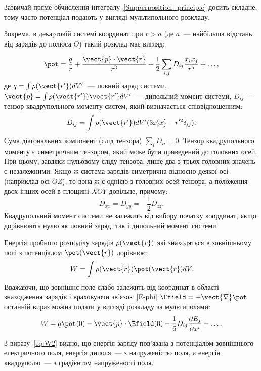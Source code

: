 \begin{Theory}
	Зазвичай пряме обчислення інтегралу~\eqref{Supperposition_principle} досить складне, тому часто потенціал подають у вигляді мультипольного розкладу.

	Зокрема, в декартовій системі координат при $r > a$ (де $a$~--- найбільша відстань від зарядів до полюса $O$) такий розклад має вигляд:

	\begin{equation}\label{eq:multipole2}
		\pot = \frac{q}{r} + \frac{\vect{p}\cdot\vect{r}}{r^3} + \frac12\sum\limits_{i,j} D_{ij}\frac{x_ix_j}{r^5} + \ldots,
	\end{equation}
	де $q = \int \rho(\vect{r'}) dV'$~--- повний заряд системи, $\vect{p} =\int \rho(\vect{r'}) \vect{r'} dV'$~--- дипольний момент системи, $D_{ij}$~--- тензор квадрупольного моменту систем, який визначається співвідношенням:
	\begin{equation}\label{eq:Quadrupole_momentum}
		D_{ij} = \int \rho(\vect{r'}) dV' (3x'_ix'_j - r^{\prime 2}\delta_{ij}).
	\end{equation}
	Сума діагональних компонент (слід тензора) $\sum\limits_{i} D_{ii} = 0$. Тензор квадрупольного моменту є симетричним тензором, який може бути приведений до головних осей. При цьому, завдяки нульовому сліду тензора, лише два з трьох головних значень є незалежними. Якщо ж система зарядів симетрична відносно деякої осі (наприклад осі $OZ$), то вона ж є однією з головних осей тензора, а положення двох інших осей в площині $XOY$ довільне, причому:
	\begin{equation}\label{eq:Quadrupole_momentum_values}
		D_{xx} = D_{yy} = -\frac12 D_{zz}.
	\end{equation}
	Квадрупольний момент системи не залежить від вибору початку координат, якщо дорівнюють нулю як повний заряд, так і дипольний момент системи.

    Енергія пробного розподілу зарядів $\rho(\vect{r})$  які знаходяться в зовнішньому полі з потенціалом $\pot(\vect{r})$ дорівнює:
\begin{equation}\label{eq:W}
    W = \int \rho(\vect{r})\pot(\vect{r})dV.
\end{equation}
Вважаючи, що зовнішнє поле  слабо залежить від координат в області знаходження зарядів  і враховуючи зв'язок~\eqref{E-phi}  $\Efield = -\vect{\nabla}\pot$ останній вираз можна подати у вигляді розкладу за мультиполями:
\begin{equation}\label{eq:W2}
    W = q \pot(0)  -\vect{p}\cdot\Efield(0) - \frac16 D_{ij} \frac{\partial E_j}{\partial x^i} + \ldots.
\end{equation}

З виразу~\eqref{eq:W2} видно, що енергія заряду пов'язана  з потенціалом зовнішнього електричного поля, енергія диполя~--- з напруженістю поля, а енергія квадруполю~--- з градієнтом напруженості поля.

\end{Theory}

